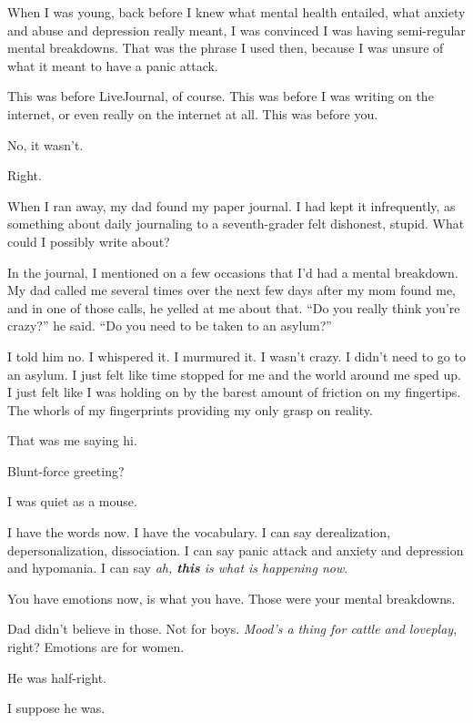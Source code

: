 \begin{paracol}{2}
  \begin{leftcolumn}

\noindent When I was young, back before I knew what mental health entailed, what anxiety and abuse and depression really meant, I was convinced I was having semi-regular mental breakdowns. That was the phrase I used then, because I was unsure of what it meant to have a panic attack.

This was before LiveJournal, of course. This was before I was writing on the internet, or even really on the internet at all. This was before you.

\begin{ally}
No, it wasn't.
\end{ally}
Right.

When I ran away, my dad found my paper journal. I had kept it infrequently, as something about daily journaling to a seventh-grader felt dishonest, stupid. What could I possibly write about?

In the journal, I mentioned on a few occasions that I'd had a mental breakdown. My dad called me several times over the next few days after my mom found me, and in one of those calls, he yelled at me about that. ``Do you really think you're crazy?'' he said. ``Do you need to be taken to an asylum?''

I told him no. I whispered it. I murmured it. I wasn't crazy. I didn't need to go to an asylum. I just felt like time stopped for me and the world around me sped up. I just felt like I was holding on by the barest amount of friction on my fingertips. The whorls of my fingerprints providing my only grasp on reality.

\begin{ally}
That was me saying hi.
\end{ally}
Blunt-force greeting?

\begin{ally}
I was quiet as a mouse.
\end{ally}
I have the words now. I have the vocabulary. I can say derealization, depersonalization, dissociation. I can say panic attack and anxiety and depression and hypomania. I can say \emph{ah, \textbf{this} is what is happening now}.

\begin{ally}
You have emotions now, is what you have. Those were your mental breakdowns.
\end{ally}
Dad didn't believe in those. Not for boys. \emph{Mood's a thing for cattle and loveplay}, right? Emotions are for women.

\begin{ally}
He was half-right.
\end{ally}
I suppose he was.

\newpage
\end{leftcolumn}
\end{paracol}
